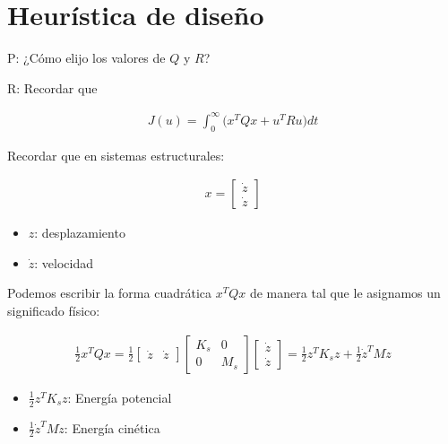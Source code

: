 \section{Heurística de diseño}

\par P: ¿Cómo elijo los valores de $Q$ y $R$? 
\par R: Recordar que

\begin{align*}
    J(u) = \int_0^\infty \Big( x^T Qx+u^T Ru\Big) dt
\end{align*}

\par Recordar que en sistemas estructurales:

\begin{align*}
    x = \left[
    \begin{array}{c}
     \dot{z} \\ \dot{z} 
    \end{array}\right]
\end{align*}

\begin{itemize}
    \item $z$: desplazamiento
    \item $\dot{z}$: velocidad
\end{itemize}

Podemos escribir la forma cuadrática $x^T Q x$ de manera tal que le asignamos un significado físico:

\begin{align*}
    \frac{1}{2}x^T Qx=\frac{1}{2}\left[
    \begin{array}{cc}
     \dot{z} & \dot{z} 
    \end{array}\right] \left[
    \begin{array}{cc}
     K_s & 0 \\ 0 & M_s 
    \end{array}\right] \left[
    \begin{array}{c}
     \dot{z} \\ \dot{z} 
    \end{array}\right] = \frac{1}{2}z^T K_s z+\frac{1}{2}\dot{z}^T M\dot{z}
\end{align*}

\begin{itemize}
    \item $\frac{1}{2}z^T K_s z$: Energía potencial
    \item $\frac{1}{2}\dot{z}^T M \dot{z}$: Energía cinética
\end{itemize}

